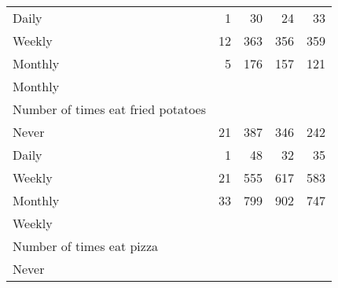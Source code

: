 \documentclass{article}
\begin{document}
\begin{tabular}{lllll}
\multicolumn{1}{l}{\hspace{5em}Daily} &
  \multicolumn{1}{|r}{1} &
  \multicolumn{1}{r}{30} &
  \multicolumn{1}{r}{24} &
  \multicolumn{1}{r}{33} \\
\multicolumn{1}{l}{\hspace{5em}Weekly} &
  \multicolumn{1}{|r}{12} &
  \multicolumn{1}{r}{363} &
  \multicolumn{1}{r}{356} &
  \multicolumn{1}{r}{359} \\
\multicolumn{1}{l}{\hspace{5em}Monthly} &
  \multicolumn{1}{|r}{5} &
  \multicolumn{1}{r}{176} &
  \multicolumn{1}{r}{157} &
  \multicolumn{1}{r}{121} \\
\multicolumn{1}{l}{\hspace{3em}Monthly} &
  \multicolumn{1}{|r}{} &
  \multicolumn{1}{r}{} &
  \multicolumn{1}{r}{} &
  \multicolumn{1}{r}{} \\
\multicolumn{1}{l}{\hspace{4em}Number of times eat fried potatoes} &
  \multicolumn{1}{|r}{} &
  \multicolumn{1}{r}{} &
  \multicolumn{1}{r}{} &
  \multicolumn{1}{r}{} \\
\multicolumn{1}{l}{\hspace{5em}Never} &
  \multicolumn{1}{|r}{21} &
  \multicolumn{1}{r}{387} &
  \multicolumn{1}{r}{346} &
  \multicolumn{1}{r}{242} \\
\multicolumn{1}{l}{\hspace{5em}Daily} &
  \multicolumn{1}{|r}{1} &
  \multicolumn{1}{r}{48} &
  \multicolumn{1}{r}{32} &
  \multicolumn{1}{r}{35} \\
\multicolumn{1}{l}{\hspace{5em}Weekly} &
  \multicolumn{1}{|r}{21} &
  \multicolumn{1}{r}{555} &
  \multicolumn{1}{r}{617} &
  \multicolumn{1}{r}{583} \\
\multicolumn{1}{l}{\hspace{5em}Monthly} &
  \multicolumn{1}{|r}{33} &
  \multicolumn{1}{r}{799} &
  \multicolumn{1}{r}{902} &
  \multicolumn{1}{r}{747} \\
\multicolumn{1}{l}{\hspace{1em}Weekly} &
  \multicolumn{1}{|r}{} &
  \multicolumn{1}{r}{} &
  \multicolumn{1}{r}{} &
  \multicolumn{1}{r}{} \\
\multicolumn{1}{l}{\hspace{2em}Number of times eat pizza} &
  \multicolumn{1}{|r}{} &
  \multicolumn{1}{r}{} &
  \multicolumn{1}{r}{} &
  \multicolumn{1}{r}{} \\
\multicolumn{1}{l}{\hspace{3em}Never} &

\end{tabular}
\end{document}
